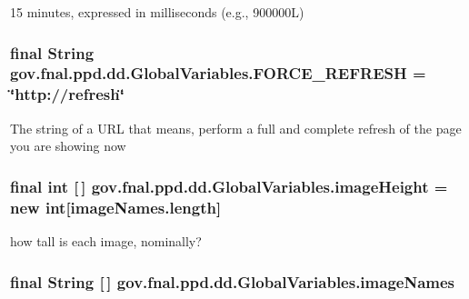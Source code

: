 15 minutes, expressed in milliseconds (e.\-g., 900000\-L) \hypertarget{classgov_1_1fnal_1_1ppd_1_1dd_1_1GlobalVariables_a79c44481889ff937b51e30d13d9c1c35}{
\subsubsection[{F\-O\-R\-C\-E\-\_\-\-R\-E\-F\-R\-E\-S\-H}]{\setlength{\rightskip}{0pt plus 5cm}final String gov.\-fnal.\-ppd.\-dd.\-Global\-Variables.\-F\-O\-R\-C\-E\-\_\-\-R\-E\-F\-R\-E\-S\-H = \char`\"{}http\-://refresh\char`\"{}\hspace{0.3cm}{\ttfamily [static]}}}\label{classgov_1_1fnal_1_1ppd_1_1dd_1_1GlobalVariables_a79c44481889ff937b51e30d13d9c1c35}
The string of a U\-R\-L that means, perform a full and complete refresh of the page you are showing now \hypertarget{classgov_1_1fnal_1_1ppd_1_1dd_1_1GlobalVariables_a4c27cf0455687a5f58b71ae0d20fd671}{
\subsubsection[{image\-Height}]{\setlength{\rightskip}{0pt plus 5cm}final int \mbox{[}$\,$\mbox{]} gov.\-fnal.\-ppd.\-dd.\-Global\-Variables.\-image\-Height = new int\mbox{[}image\-Names.\-length\mbox{]}\hspace{0.3cm}{\ttfamily [static]}}}\label{classgov_1_1fnal_1_1ppd_1_1dd_1_1GlobalVariables_a4c27cf0455687a5f58b71ae0d20fd671}
how tall is each image, nominally? \hypertarget{classgov_1_1fnal_1_1ppd_1_1dd_1_1GlobalVariables_a356be5e37e706b201f6bc26130b73ce3}{
\subsubsection[{image\-Names}]{\setlength{\rightskip}{0pt plus 5cm}final String \mbox{[}$\,$\mbox{]} gov.\-fnal.\-ppd.\-dd.\-Global\-Variables.\-image\-Names\hspace{0.3cm}{\ttfamily [static]}}}\label{classgov_1_1fnal_1_1ppd_1_1dd_1_1GlobalVariables_a356be5e37e706b201f6bc26130b73ce3}
